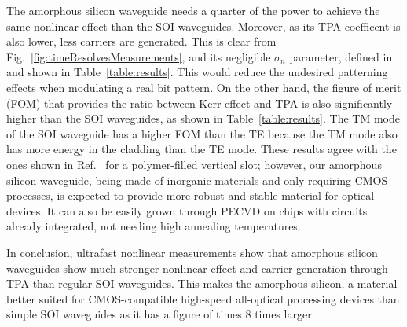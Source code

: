 \documentclass[10pt,letterpaper]{article}
\begin{document}
The amorphous silicon waveguide needs a quarter of the power to achieve the same nonlinear effect than the SOI waveguides. Moreover, as its TPA coefficent is also lower, less carriers are generated. This is clear from Fig.~\ref{fig:timeResolvesMeasurements}, and its negligible $\sigma_n$ parameter, defined in \cite{Lin2007} and shown in Table~\ref{table:results}. This would reduce the undesired patterning effects when modulating a real bit pattern. On the other hand, the figure of merit (FOM) that provides the ratio between Kerr effect and TPA is also significantly higher than the SOI waveguides, as shown in Table~\ref{table:results}. The TM mode of the SOI waveguide has a higher FOM than the TE because the TM mode also has more energy in the cladding than the TE mode. These results agree with the ones shown in Ref.~\cite{Vallaitis2009} for a polymer-filled vertical slot; however, our amorphous silicon waveguide, being made of inorganic materials and only requiring CMOS processes, is expected to provide more 
robust and stable material for optical devices. It can also be easily grown through PECVD on chips with circuits already integrated, not needing high annealing temperatures.

In conclusion, ultrafast nonlinear measurements show that amorphous silicon waveguides show much stronger nonlinear effect and carrier generation through TPA than regular SOI waveguides. This makes the amorphous silicon, a material better suited for CMOS-compatible high-speed all-optical processing devices than simple SOI waveguides as it has a figure of times 8 times larger.
\end{document}
